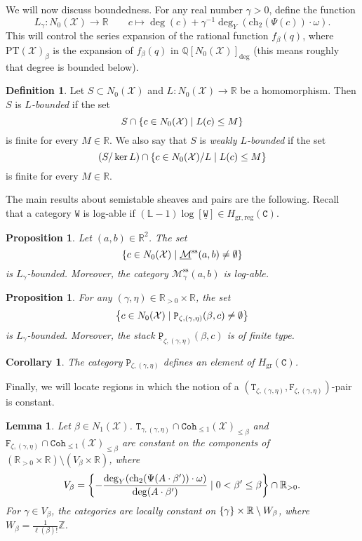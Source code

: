 \documentclass[leqno, openany]{memoir}
\newtheorem{cor}[thm]{Corollary}
\newtheorem{prop}[thm]{Proposition}
\newtheorem{lem}[thm]{Lemma}
\theoremstyle{definition}
\newtheorem{defn}[thm]{Definition}
\theoremstyle{remark}
\theoremstyle{plain}
\theoremstyle{definition}
\theoremstyle{remark}
\newcommand{\R}{\mathbb{R}}
\newcommand{\Z}{\mathbb{Z}}
\newcommand{\Q}{\mathbb{Q}}
\renewcommand{\L}{\mathbb{L}}
\newcommand{\mc}[1]{\mathcal{#1}}
\newcommand{\mr}[1]{\mathrm{#1}}
\newcommand{\mt}[1]{\mathtt{#1}}
\newcommand{\on}[1]{\operatorname{#1}}
\newcommand{\ul}[1]{\underline{#1}}
\begin{document}
We will now discuss boundedness. For any real number $\gamma > 0$, define the function
\[ L_{\gamma} \colon N_0(\mc{X}) \to \R \qquad c \mapsto \deg(c) + \gamma^{-1} \deg_Y(\on{ch_2}(\Psi(c)) \cdot \omega). \]
This will control the series expansion of the rational function $f_{\beta}(q)$, where $\mr{PT}(\mc{X})_{\beta}$ is the expansion of $f_{\beta}(q)$ in $\Q[N_0(\mc{X})]_{\mr{deg}}$ (this means roughly that degree is bounded below).

\begin{defn}
    Let $S \subset N_0(\mc{X})$ and $L \colon N_0(\mc{X}) \to \R$ be a homomorphism. Then $S$ is \textit{$L$-bounded} if the set
    \[ S \cap \qty{c \in N_0(\mc{X}) \mid L(c) \leq M} \]
    is finite for every $M \in \R$. We also say that $S$ is \textit{weakly $L$-bounded} if the set
    \[ (S/\ker L) \cap \qty{c \in N_0(\mc{X})/L \mid L(c) \leq M} \]
    is finite for every $M \in \R$.
\end{defn}

The main results about semistable sheaves and pairs are the following. Recall that a category $\mt{W}$ is log-able if $(\L-1) \log[\mt{\ul{W}}] \in H_{\mr{gr,reg}}(\mt{C})$.
\begin{prop}
    Let $(a,b) \in \R^2$. The set
    \[ \qty{ c \in N_0(\mc{X}) \mid \ul{\mc{M}}^{\mr{ss}}(a,b) \neq \emptyset} \]
    is $L_{\gamma}$-bounded. Moreover, the category $\mc{M}_{\gamma}^{\mr{ss}}(a, b)$ is log-able.
\end{prop}

\begin{prop}
    For any $(\gamma, \eta) \in \R_{>0} \times \R$, the set
    \[ \qty{c \in N_0(\mc{X}) \mid \mt{P}_{\zeta, (\gamma, \eta)}(\beta, c) \neq \emptyset} \]
    is $L_{\gamma}$-bounded. Moreover, the stack $\mt{\ul{P}}_{\zeta, (\gamma,\eta)}(\beta, c)$ is of finite type.
\end{prop}

\begin{cor}
    The category $\mt{P}_{\zeta, (\gamma, \eta)}$ defines an element of $H_{\mr{gr}}(\mt{C})$.
\end{cor}

Finally, we will locate regions in which the notion of a $(\mt{T}_{\zeta,(\gamma,\eta)}, \mt{F}_{\zeta, (\gamma,\eta)})$-pair is constant.

\begin{lem}
    Let $\beta \in N_1(\mc{X})$. $\mt{T}_{\gamma,(\gamma,\eta)} \cap \mt{Coh}_{\leq 1}(\mc{X})_{\leq \beta}$ and $\mt{F}_{\zeta, (\gamma,\eta)} \cap \mt{Coh}_{\leq 1}(\mc{X})_{\leq \beta}$ are constant on the components of $(\R_{>0} \times \R) \setminus (V_{\beta} \times \R)$, where
    \[ V_{\beta} = \qty{- \frac{\deg_Y(\on{ch}_2(\Psi(A \cdot \beta')) \cdot \omega)}{\deg(A \cdot \beta')} \mid 0 < \beta' \leq \beta} \cap \R_{>0}. \]
    For $\gamma \in V_{\beta}$, the categories are locally constant on $\qty{\gamma} \times \R \setminus W_{\beta}$, where $W_{\beta} = \frac{1}{\ell(\beta)!} \Z$.
\end{lem}
\end{document}
